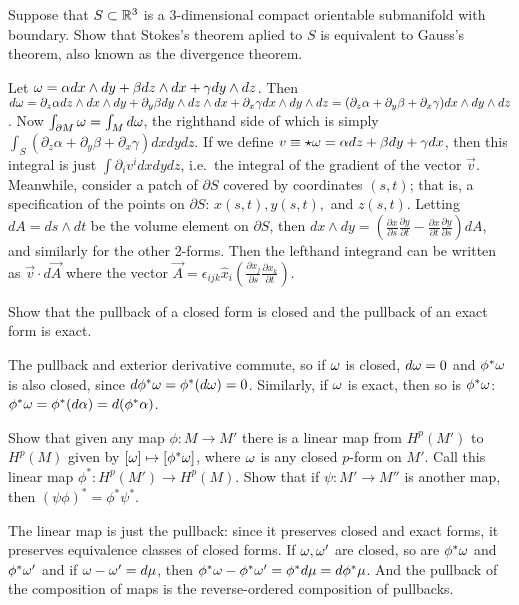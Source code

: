 \begin{p}%
{Suppose that $S\subset \mathbb{R}^3$ is a 3-dimensional compact orientable submanifold with boundary. Show that Stokes's theorem aplied to $S$ is equivalent to Gauss's theorem, also known as the divergence theorem.}
\end{p}
{Let $\omega=\alpha dx\wedge dy+\beta dz\wedge dx+\gamma dy\wedge dz$. Then $d\omega=\partial_z \alpha dz\wedge dx\wedge dy+\partial_y \beta dy\wedge dz\wedge dx+\partial_x \gamma dx\wedge dy\wedge dz=(\partial_z\alpha+\partial_y\beta+\partial_x \gamma)dx\wedge dy\wedge dz$. Now $\int_{\partial M}\omega=\int_M d\omega$, the righthand side of which is simply $\int_S(\partial_z\alpha+\partial_y\beta+\partial_x \gamma) dxdydz$. If we define
$v\equiv\star\omega=\alpha dz+\beta dy+\gamma dx$, then this integral is just $\int \partial_iv^i dxdydz$, i.e.~the integral of the gradient of the vector $\vec{v}$. Meanwhile, 
consider a patch of $\partial S$ covered by coordinates $(s,t)$; that is, a specification of the points on $\partial S$: $x(s,t), y(s,t),$ and $z(s,t)$. Letting $dA=ds\wedge dt$ be the volume element on $\partial S$, then $dx\wedge dy=(\frac{\partial x}{\partial s}\frac{\partial y}{\partial t}-\frac{\partial x}{\partial t}\frac{\partial y}{\partial s})dA$, and similarly for the other 2-forms. Then the lefthand integrand can be written as $\vec{v}\cdot d\vec{A}$ where the vector $\vec{A}=
\epsilon_{ijk}\hat{x}_i(\frac{\partial x_j}{\partial s}\frac{\partial x_k}{\partial t})$.}

\begin{p}%
{Show that the pullback of a closed form is closed and the pullback of an exact form is exact.}
\end{p}
{The pullback and exterior derivative commute, so if $\omega$ is closed, $d\omega=0$ and $\phi^*\omega$ is also closed, since $d\phi^*\omega=\phi^* (d\omega)=0$. 
Similarly, if $\omega$ is exact, then so is $\phi^*\omega$: $\phi^*\omega=\phi^*(d\alpha)=d(\phi^*\alpha)$.}

\begin{p}%
{Show that given any map $\phi:M\rightarrow M'$ there is a linear map 
from $H^p(M')$ to $H^p(M)$ given by $[\omega]\mapsto[\phi^*\omega]$, where
$\omega$ is any closed $p$-form on $M'$. Call this linear map $\phi^*:H^p(M')\rightarrow H^p(M)$. Show that if $\psi:M'\rightarrow M''$ is another map, then $(\psi\phi)^*=\phi^*\psi^*$.}
\end{p}
{The linear map is just the pullback:
since it preserves closed and exact forms, it preserves equivalence classes of closed forms. If
$\omega,\omega'$ are closed, so are $\phi^*\omega$ and $\phi^*\omega'$ and if $\omega-\omega'=d\mu$, then $\phi^*\omega-\phi^*\omega'=\phi^*d\mu=d\phi^*\mu$. And the pullback of the composition of maps is the reverse-ordered composition of pullbacks.}

